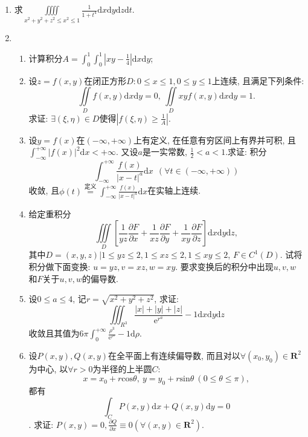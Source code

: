 \begin{enumerate}
\item 求$\displaystyle{\iiiint\limits_{x^2+y^2+z^2\le x^2\le 1}\frac{1}{1+t^4}\mathrm{d}x\mathrm{d}y\mathrm{d}z\mathrm{d}t}$.
\item 
\begin{enumerate}
	\item 计算积分$A=\int_{0}^{1}\int_{0}^{1}|xy-\frac{1}{4}|\mathrm{d}x\mathrm{d}y$;
	\item 设$z=f(x,y)$在闭正方形$D:0\le x\le 1,0\le y\le 1$上连续, 且满足下列条件:
	$$ \displaystyle{\iint\limits_{D}f(x,y)\mathrm{d}x\mathrm{d}y = 0,\ \iint\limits_{D}xyf(x,y)\mathrm{d}x\mathrm{d}y=1.}$$
		求证: $\exists (\xi,\eta)\in D$使得$|f(\xi,\eta)\ge\frac{1}{A}|$.
\item 设$y=f(x)$在$(-\infty,+\infty)$上有定义, 在任意有穷区间上有界并可积, 且\\ $\displaystyle{\int_{-\infty}^{+\infty}|f(x)|^2\mathrm{d}x
<+\infty}$. 又设$a$是一实常数, $\frac{1}{2}<a<1$.求证: 积分
$$\displaystyle{\int_{-\infty}^{+\infty}\frac{f(x)}{|x-t|^a}\mathrm{d}x}\ \ (\forall t\in(-\infty,+\infty))$$收敛, 且$\phi(t)\overset{\text{定义}}{=}\int_{-\infty}^{+\infty}\frac{f(x)}{|x-t|^a}\mathrm{d}x$在实轴上连续.
\item 给定重积分$$\displaystyle{\iiint\limits_{D}\left[\frac{1}{yz}\frac{\partial F}{\partial x}+\frac{1}{xz}\frac{\partial F}{\partial y}+\frac{1}{xy}\frac{\partial F}{\partial z}\right]\mathrm{d}x\mathrm{d}y\mathrm{d}z}, $$
其中$D={(x,y,z)|1\le yz\le 2,1\le xz\le 2,1\le xy\le 2}$, $F\in C^1(D)$. 试将积分做下面变换: $u=yz,v=xz,w=xy$. 要求变换后的积分中出现$u,v,w$和$F$关于$u,v,w$的偏导数.
\item 设$0\le a\le 4$, 记$r=\sqrt{x^2+y^2+z^2}$, 求证:
$$\displaystyle{\iiint_{R^3}\frac{|x|+|y|+|z|}{\mathrm{e}^{r^a}}-1\mathrm{d}x\mathrm{d}y\mathrm{d}z}$$
收敛且其值为$6\pi\displaystyle{\int_{0}^{+\infty}\frac{\rho^3}{\mathrm{e}^{r^a}}-1\mathrm{d}\rho}$.
\item 设$P(x,y),Q(x,y)$在全平面上有连续偏导数, 而且对以$\forall (x_0,y_0)\in \bm{R}^2$为中心, 以$\forall r>0$为半径的上半圆$C$:$$
x=x_0+r\mathrm{cos}\theta,\ y=y_0+r\mathrm{sin}\theta\ (0\le \theta\le \pi),$$
都有$$\displaystyle{\int_{C}P(x,y)\mathrm{d}x+Q(x,y)\mathrm{d}y=0}$$.
求证: $P(x,y)=0,\frac{\partial Q}{\partial x}\equiv 0(\forall (x,y)\in \bm{R}^2)$.
\end{enumerate}	
\end{enumerate}